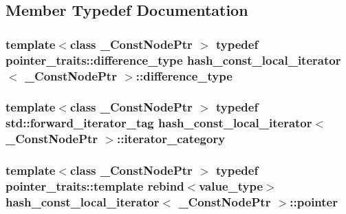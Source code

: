 \subsection{Member Typedef Documentation}
\hypertarget{classhash__const__local__iterator_aeb5f0926216599a01a0df40329208f91}{}
\subsubsection[{difference\+\_\+type}]{\setlength{\rightskip}{0pt plus 5cm}template$<$class \+\_\+\+Const\+Node\+Ptr $>$ typedef pointer\+\_\+traits\+::difference\+\_\+type {\bf hash\+\_\+const\+\_\+local\+\_\+iterator}$<$ \+\_\+\+Const\+Node\+Ptr $>$\+::{\bf difference\+\_\+type}}\label{classhash__const__local__iterator_aeb5f0926216599a01a0df40329208f91}
\hypertarget{classhash__const__local__iterator_aec8b54be78028f13749b7a12c2e3b5a2}{}
\subsubsection[{iterator\+\_\+category}]{\setlength{\rightskip}{0pt plus 5cm}template$<$class \+\_\+\+Const\+Node\+Ptr $>$ typedef std\+::forward\+\_\+iterator\+\_\+tag {\bf hash\+\_\+const\+\_\+local\+\_\+iterator}$<$ \+\_\+\+Const\+Node\+Ptr $>$\+::{\bf iterator\+\_\+category}}\label{classhash__const__local__iterator_aec8b54be78028f13749b7a12c2e3b5a2}
\hypertarget{classhash__const__local__iterator_acfcca3eb814a6062a2f3cdb62ebc94e4}{}
\subsubsection[{pointer}]{\setlength{\rightskip}{0pt plus 5cm}template$<$class \+\_\+\+Const\+Node\+Ptr $>$ typedef pointer\+\_\+traits\+::template rebind$<${\bf value\+\_\+type}$>$ {\bf hash\+\_\+const\+\_\+local\+\_\+iterator}$<$ \+\_\+\+Const\+Node\+Ptr $>$\+::{\bf pointer}}\label{classhash__const__local__iterator_acfcca3eb814a6062a2f3cdb62ebc94e4}
\hypertarget{classhash__const__local__iterator_a651a8f3ade8e5024bc7819582c854f83}{}
